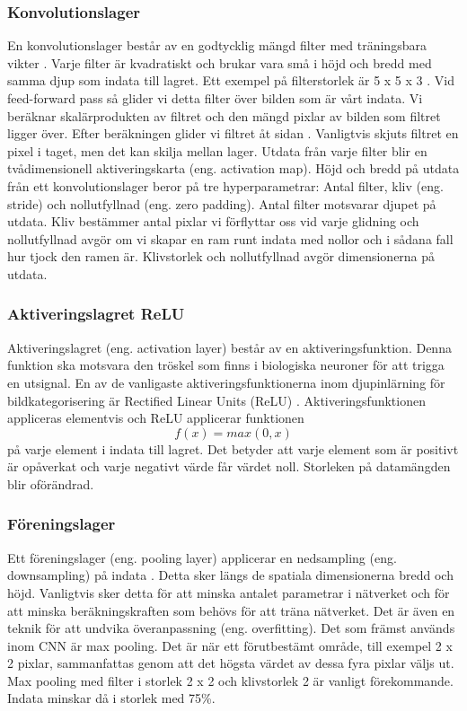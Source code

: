 \documentclass[]{kththesis}
\begin{document}
\subsubsection{Konvolutionslager}
En konvolutionslager består av en godtycklig mängd filter med träningsbara vikter \parencite{lecun1995convolutional}. Varje filter är kvadratiskt och brukar vara små i höjd och bredd med samma djup som indata till lagret. Ett exempel på filterstorlek är 5 x 5 x 3 \parencite{krizhevsky2012imagenet}. Vid feed-forward pass så glider vi detta filter över bilden som är vårt indata. Vi beräknar skalärprodukten av filtret och den mängd pixlar av bilden som filtret ligger över. Efter beräkningen glider vi filtret åt sidan \parencite{he2015spatial}. Vanligtvis skjuts filtret en pixel i taget, men det kan skilja mellan lager. Utdata från varje filter blir en tvådimensionell aktiveringskarta (eng. activation map). Höjd och bredd på utdata från ett konvolutionslager beror på tre hyperparametrar: Antal filter, kliv (eng. stride) och nollutfyllnad (eng. zero padding). Antal filter motsvarar djupet på utdata. Kliv bestämmer antal pixlar vi förflyttar oss vid varje glidning och nollutfyllnad avgör om vi skapar en ram runt indata med nollor och i sådana fall hur tjock den ramen är. Klivstorlek och nollutfyllnad avgör dimensionerna på utdata.

\subsubsection{Aktiveringslagret ReLU}
Aktiveringslagret (eng. activation layer) består av en aktiveringsfunktion. Denna funktion ska motsvara den tröskel som finns i biologiska neuroner för att trigga en utsignal. En av de vanligaste aktiveringsfunktionerna inom djupinlärning för bildkategorisering är Rectified Linear Units (ReLU) \parencite{krizhevsky2012imagenet}. Aktiveringsfunktionen appliceras elementvis och ReLU applicerar funktionen \begin{equation} f(x) = max(0,x) \end{equation} på varje element i indata till lagret. Det betyder att varje element som är positivt är opåverkat och varje negativt värde får värdet noll. Storleken på datamängden blir oförändrad.

\subsubsection{Föreningslager}
Ett föreningslager (eng. pooling layer) applicerar en nedsampling (eng. downsampling) på indata \parencite{krizhevsky2012imagenet}. Detta sker längs de spatiala dimensionerna bredd och höjd. Vanligtvis sker detta för att minska antalet parametrar i nätverket och för att minska beräkningskraften som behövs för att träna nätverket. Det är även en teknik för att undvika överanpassning (eng. overfitting). Det som främst används inom CNN är max pooling. Det är när ett förutbestämt område, till exempel 2 x 2 pixlar, sammanfattas genom att det högsta värdet av dessa fyra pixlar väljs ut. Max pooling med filter i storlek 2 x 2 och klivstorlek 2 är vanligt förekommande. Indata minskar då i storlek med 75\%.
\end{document}
